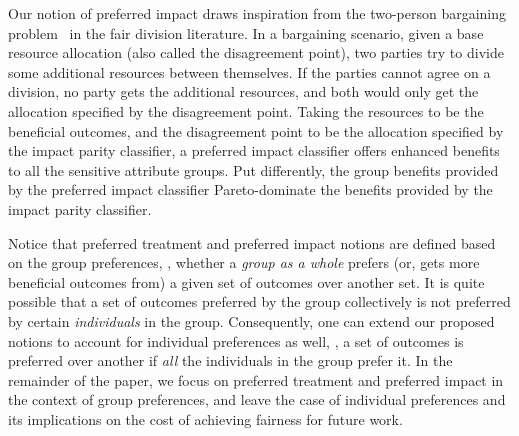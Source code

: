 \documentclass{article}
\newcommand{\xhdr}[1]{\vspace{0mm}\noindent{{\bf #1.}}}
\begin{document}
Our notion of preferred impact draws inspiration from the two-person
bargaining problem~\cite{nash1950bargaining} in the fair division
literature. In a bargaining scenario, given a base resource allocation
(also called the disagreement point), two parties try to divide some
additional resources between themselves. If the parties cannot agree
on a division, no party gets the additional resources, and both would
only get the allocation specified by the disagreement point. Taking
the resources to be the beneficial outcomes, and the disagreement
point to be the allocation specified by the impact parity classifier,
a preferred impact classifier offers enhanced benefits to all the
sensitive attribute groups. Put differently, the group benefits provided
by the preferred impact classifier Pareto-dominate the benefits
provided by the impact parity classifier.


\xhdr{On individual-level preferences}
Notice that preferred treatment and preferred impact notions are defined based on the group preferences, \ie, whether a  \textit{group as a whole} prefers (or, gets more beneficial outcomes from) a given set of outcomes over another set. It is quite possible that a set of outcomes preferred by the group collectively is not preferred by certain \textit{individuals} in the group.
Consequently, one can extend our proposed notions to account for individual preferences as well, \ie, a set of outcomes is preferred over another if \emph{all} the individuals in the group prefer it. In the remainder of the paper, we focus on preferred treatment and preferred impact in the context of group preferences, and leave the case of individual preferences and its implications on the cost of achieving fairness for future work.
\end{document}
